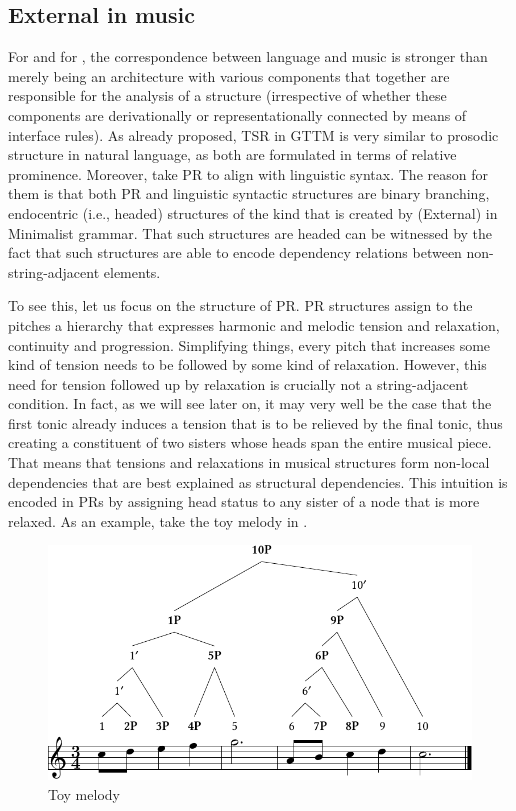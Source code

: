 \documentclass[output=paper]{langsci/langscibook}
\begin{document}
\subsection{External  in music}\label{sec:26.3.2}

For \citeauthor{LerJac1983} and for \citeauthor{KatzPes2011}, the
correspondence between language and music is stronger than merely being an
architecture with various components that together are responsible for the
analysis of a structure (irrespective of whether these components are
derivationally or representationally connected by means of interface rules). As
\citeauthor{LerJac1983} already proposed, \gls{TSR} in \gls{GTTM} is very similar to prosodic structure in natural
language, as both are formulated in terms of relative prominence. Moreover,
\citeauthor{KatzPes2011} take \gls{PR} to align with linguistic syntax.  The
reason for them is that both \gls{PR} and linguistic syntactic structures are
binary branching, endocentric (i.e., headed) structures of the kind that is
created by (External)  in Minimalist grammar. That such structures
are headed can be witnessed by the fact that such structures are able to encode
dependency relations between non-string-adjacent elements.

To see this, let us focus on the structure of \gls{PR}. \gls{PR} structures
assign to the pitches a hierarchy that expresses harmonic and melodic tension
and relaxation, continuity and progression. Simplifying things, every pitch
that increases some kind of tension needs to be followed by some kind of
relaxation. However, this need for tension followed up by relaxation is
crucially not a string-adjacent condition. In fact, as we will see later on, it
may very well be the case that the first tonic already induces a tension that
is to be relieved by the final tonic, thus creating a constituent of two
sisters whose heads span the entire musical piece. That means that tensions and
relaxations in musical structures form non-local dependencies that are best
explained as structural dependencies.  This intuition is encoded in \glspl{PR}
by assigning head status to any sister of a node that is more relaxed.
As an example, take the toy melody in .

\begin{figure}
\caption{\label{bkm:Ref348696475}Toy melody
\parencite[16]{KatzPes2011}}
\includegraphics[width=\textwidth]{./img/28-7.pdf}
\end{figure}
\end{document}
